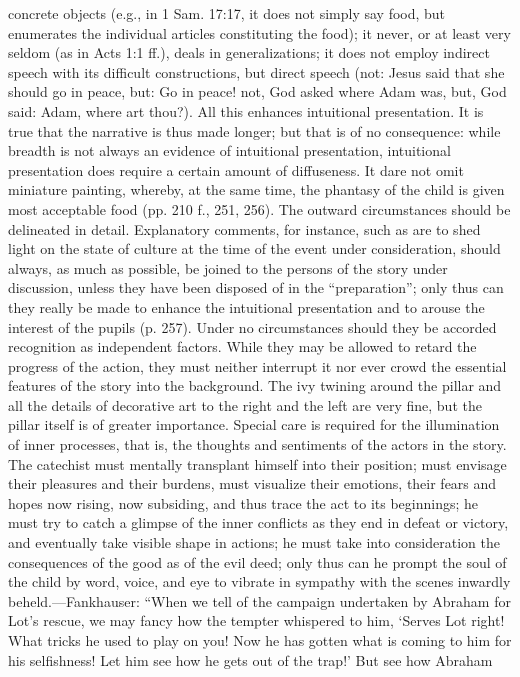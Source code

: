 concrete objects (e.g., in 1 Sam. 17:17, it does not simply say food, but enumerates the individual articles constituting the food); it never, or at least very seldom (as in Acts 1:1 ff.), deals in generalizations; it does not employ indirect speech with its difficult constructions, but direct speech (not: Jesus said that she should go in peace, but: Go in peace! not, God asked where Adam was, but, God said: Adam, where art thou?). All this enhances intuitional presentation. It is true that the narrative is thus made longer; but that is of no consequence: while breadth is not always an evidence of intuitional presentation, intuitional presentation does require a certain amount of diffuseness. It dare not omit miniature painting, whereby, at the same time, the phantasy of the child is given most acceptable food (pp. 210 f., 251, 256). The outward circumstances should be delineated in detail. Explanatory comments, for instance, such as are to shed light on the state of culture at the time of the event under consideration, should always, as much as possible, be joined to the persons of the story under discussion, unless they have been disposed of in the “preparation”; only thus can they really be made to enhance the intuitional presentation and to arouse the interest of the pupils (p. 257). Under no circumstances should they be accorded recognition as independent factors. While they may be allowed to retard the progress of the action, they must neither interrupt it nor ever crowd the essential features of the story into the background. The ivy twining around the pillar and all the details of decorative art to the right and the left are very fine, but the pillar itself is of greater importance. Special care is required for the illumination of inner processes, that is, the thoughts and sentiments of the actors in the story. The catechist must mentally transplant himself into their position; must envisage their pleasures and their burdens, must visualize their emotions, their fears and hopes now rising, now subsiding, and thus trace the act to its beginnings; he must try to catch a glimpse of the inner conflicts as they end in defeat or victory, and eventually take visible shape in actions; he must take into consideration the consequences of the good as of the evil deed; only thus can he prompt the soul of the child by word, voice, and eye to vibrate in sympathy with the scenes inwardly beheld.—Fankhauser: “When we tell of the campaign undertaken by Abraham for Lot’s rescue, we may fancy how the tempter whispered to him, ‘Serves Lot right! What tricks he used to play on you! Now he has gotten what is coming to him for his selfishness! Let him see how he gets out of the trap!’ But see how Abraham
